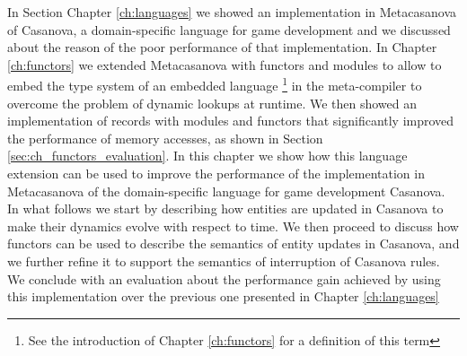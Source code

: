 In Section Chapter \ref{ch:languages} we showed an implementation in Metacasanova of Casanova, a domain-specific language for game development and we discussed about the reason of the poor performance of that implementation. In Chapter \ref{ch:functors} we extended Metacasanova with functors and modules to allow to embed the type system of an embedded  language \footnote{See the introduction of Chapter \ref{ch:functors} for a definition of this term} in the meta-compiler to overcome the problem of dynamic lookups at runtime. We then showed an implementation of records with modules and functors that significantly improved the performance of memory accesses, as shown in Section \ref{sec:ch_functors_evaluation}. In this chapter we show how this language extension can be used to improve the performance of the implementation in Metacasanova of the domain-specific language for game development Casanova. In what follows we start by describing how entities are updated in Casanova to make their dynamics evolve with respect to time. We then proceed to discuss how functors can be used to describe the semantics of entity updates in Casanova, and we further refine it to support the semantics of interruption of Casanova rules. We conclude with an evaluation about the performance gain achieved by using this implementation over the previous one presented in Chapter \ref{ch:languages}


